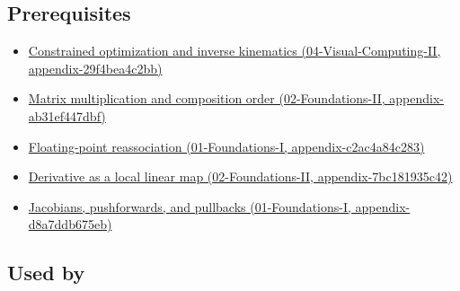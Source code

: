 \subsection{Prerequisites}\label{appendix-40df0855b4a7-prerequisites}

\begin{itemize}
\tightlist
\item
  \href{../04-Visual-Computing-II/main.pdf\#nameddest=appendix-29f4bea4c2bb}{Constrained optimization and inverse kinematics (04-Visual-Computing-II, appendix-29f4bea4c2bb)}
\item
  \href{../02-Foundations-II/main.pdf\#nameddest=appendix-ab31ef447dbf}{Matrix multiplication and composition order (02-Foundations-II, appendix-ab31ef447dbf)}
\item
  \href{../01-Foundations-I/main.pdf\#nameddest=appendix-c2ac4a84c283}{Floating-point reassociation (01-Foundations-I, appendix-c2ac4a84c283)}
\item
  \href{../02-Foundations-II/main.pdf\#nameddest=appendix-7bc181935c42}{Derivative as a local linear map (02-Foundations-II, appendix-7bc181935c42)}
\item
  \href{../01-Foundations-I/main.pdf\#nameddest=appendix-d8a7ddb675eb}{Jacobians, pushforwards, and pullbacks (01-Foundations-I, appendix-d8a7ddb675eb)}
\end{itemize}

\subsection{Used by}\label{appendix-40df0855b4a7-used-by}

